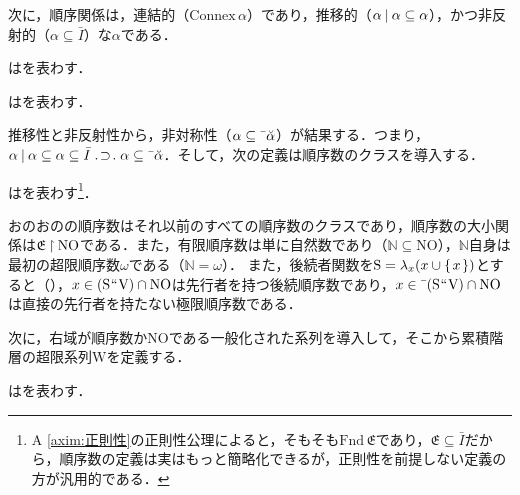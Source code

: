 \noindent 次に，順序関係は，連結的（$\mathrm{Connex}\,\alpha$）であり，推移的（$ \alpha\mathbin{\mid}\alpha\subseteq\alpha $），かつ非反射的（$\alpha\subseteq\bar{I}$）な$\alpha$である．

\begin{df}
\label{df:連結性}
はを表わす．
\end{df}

\begin{df}
\label{df:順序}
はを表わす．
\end{df}
\noindent 推移性と非反射性から，非対称性（$\alpha\subseteq\bar{\:\:}\breve{\alpha}$）が結果する．つまり，
$ \alpha\resl\alpha\subseteq\alpha\subseteq\bar{I}\case{1}{1}{1}\alpha\subseteq\barl{\breve{\alpha}} $．そして，次の定義は順序数のクラスを導入する．
\begin{df}
\label{df:順序数}
はを表わす\footnote{
    A \ref{axim:正則性}の正則性公理によると，そもそも$ \mathrm{Fnd}\,\mathfrak{E} $であり，$ \mathfrak{E}\subseteq\bar{I} $だから，順序数の定義は実はもっと簡略化できるが，正則性を前提しない定義の方が汎用的である．
}．
\end{df}

\noindent おのおのの順序数はそれ以前のすべての順序数のクラスであり，順序数の大小関係は$ \mathfrak{E}\mathbin{\upharpoonright}\mathrm{NO} $である．また，有限順序数は単に自然数であり（$ \mathbb{N}\subseteq\mathrm{NO} $），$\mathbb{N}$自身は最初の超限順序数$\omega$である（$\mathbb{N}=\omega$）．
また，後続者関数を$ \mathrm{S} = \lambda_x(x\cup\{\mspace{2mu}x\mspace{2mu}\}) $とすると（），$ x\in(\mathrm{S}{\mspace{1mu}{``}\mspace{1mu}}\mathrm{V})\cap\mathrm{NO} $は先行者を持つ後続順序数であり，$ x\in\bar{\:\:}(\mathrm{S}{\mspace{1mu}{``}\mspace{1mu}}\mathrm{V})\cap\mathrm{NO} $は直接の先行者を持たない極限順序数である．

次に，右域が順序数か$ \mathrm{NO} $である一般化された系列を導入して，そこから累積階層の超限系列$\mathrm{W}$を定義する．
\begin{df}
\label{df:超限系列}
\kagi{$
    \seq\alpha
$}はを表わす．
\end{df}

